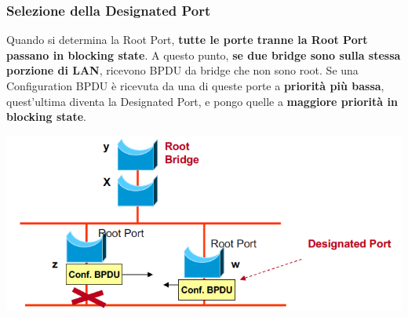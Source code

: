 \documentclass[12pt]{article}
\begin{document}
\subsubsection{Selezione della Designated Port}

Quando si determina la Root Port, \textbf{tutte le porte tranne la Root Port passano in blocking state}. A questo punto, \textbf{se due bridge sono sulla stessa porzione di LAN}, ricevono BPDU da bridge che non sono root. Se una Configuration BPDU è ricevuta da una di queste porte a \textbf{priorità più bassa}, quest'ultima diventa la Designated Port, e pongo quelle a \textbf{maggiore priorità in blocking state}.
\begin{center}
    \includegraphics[scale=0.5]{spanning_tree_designated_port}
\end{center}
\end{document}
